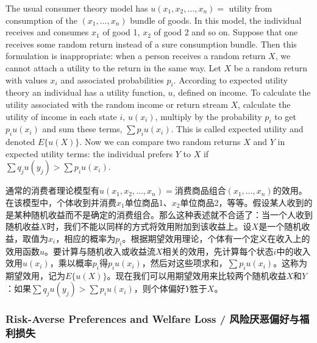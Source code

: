 \begin{original}
The usual consumer theory model has $u(x_1, x_2, \dots, x_n) =$ utility from consumption of the $(x_1, \dots, x_n)$ bundle of goods. In this model, the individual receives and consumes $x_1$ of good 1, $x_2$ of good 2 and so on. Suppose that one receives some random return instead of a sure consumption bundle. Then this formulation is inappropriate: when a person receives a random return $X$, we cannot attach a utility to the return in the same way. Let $X$ be a random return with values $x_i$ and associated probabilities $p_i$. According to expected utility theory an individual has a utility function, $u$, defined on income. To calculate the utility associated with the random income or return stream $X$, calculate the utility of income in each state $i$, $u(x_i)$, multiply by the probability $p_i$ to get $p_i u(x_i)$ and sum these terms, $\sum p_i u(x_i)$. This is called expected utility and denoted $E\{u(X)\}$. Now we can compare two random returns $X$ and $Y$ in expected utility terms: the individual prefers $Y$ to $X$ if $\sum q_j u(y_j) > \sum p_i u(x_i)$.
\end{original}
\begin{translation}
通常的消费者理论模型有$u(x_1, x_2, \dots, x_n) = $消费商品组合$(x_1, \dots, x_n)$的效用。在该模型中，个体收到并消费$x_1$单位商品1、$x_2$单位商品2，等等。假设某人收到的是某种随机收益而不是确定的消费组合。那么这种表述就不合适了：当一个人收到随机收益$X$时，我们不能以同样的方式将效用附加到该收益上。设$X$是一个随机收益，取值为$x_i$，相应的概率为$p_i$。根据期望效用理论，个体有一个定义在收入上的效用函数$u$。要计算与随机收入或收益流$X$相关的效用，先计算每个状态$i$中的收入效用$u(x_i)$，乘以概率$p_i$得$p_i u(x_i)$，然后对这些项求和，$\sum p_i u(x_i)$。这称为期望效用，记为$E\{u(X)\}$。现在我们可以用期望效用来比较两个随机收益$X$和$Y$：如果$\sum q_j u(y_j) > \sum p_i u(x_i)$，则个体偏好$Y$胜于$X$。
\end{translation}

\subsubsection{Risk-Averse Preferences and Welfare Loss / 风险厌恶偏好与福利损失}

